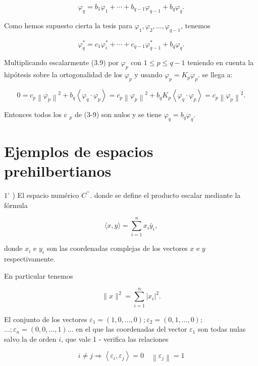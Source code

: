 \documentclass[10pt]{article}
\theoremstyle{plain}
\theoremstyle{definition}
\theoremstyle{remark}
\begin{document}
$$
\varphi_{q}=b_{1} \varphi_{1}+\cdots+b_{q-1} \varphi_{q-1}+b_{q} \varphi_{q} .
$$

Como hemos supuesto cierta la tesis para $\varphi_{1}, \varphi_{2}, \ldots, \varphi_{q-1}$, tenemos


\begin{equation*}
\varphi_{q}^{*}=c_{1} \varphi_{i}^{*}+\cdots+c_{q-1} \varphi_{q-1}^{*}+b_{q} \varphi_{q} . \tag{3-9}
\end{equation*}


Multiplicando escalarmente (3.9) por $\varphi_{p}$ con $1 \leqslant p \leqslant q-1$ teniendo en cuenta la hipótesis sobre la ortogonalidad de los $\varphi_{p}$ y usando $\varphi_{p}=K_{p} \varphi_{p}$. se llega a:

$$
0=c_{p}\left\|\varphi_{\dot{p}}\right\|^{2}+b_{q}\left\langle\varphi_{q} \cdot \varphi_{p}\right\rangle=c_{p}\left\|\varphi_{\dot{p}}\right\|^{2}+b_{q} K_{p}\left\langle\varphi_{q} \cdot \varphi_{p}\right\rangle=c_{p}\left\|\varphi_{p}\right\|^{2} .
$$

Entonces todos los c ${ }_{p}$ de (3-9) son nulos y se tiene $\varphi_{\dot{q}}=b_{q} \varphi_{q}$.

\section*{Ejemplos de espacios prehilbertianos}
$1^{\circ}$ ) El espacio numérico $C^{\prime \prime}$. donde se define el producto escalar mediante la fórmula



\begin{equation*}
\langle x, y\rangle=\sum_{i=1}^{n} x_{i} \bar{y}_{i}, \tag{$3\cdot10$}
\end{equation*}


donde $x_{i}$ e $y_{i}$ son las coordenadas complejas de los vectores $x$ e $y$ respectivamente.

En particular tenemos


\begin{equation*}
\|x\|^{2}=\sum_{i=1}^{n}\left|x_{i}\right|^{2} . \tag{3•11}
\end{equation*}


El conjunto de los vectores $\varepsilon_{1}=(1,0, \ldots, 0) ; \varepsilon_{2}=(0,1, \ldots, 0)$; $\ldots ; \varepsilon_{n}=(0,0, \ldots, 1) \ldots$ en el que las coordenadas del vector $\varepsilon_{1}$ son todas nulas salvo la de orden $i$, que vale 1 - verifica las relaciones

$$
i \neq j \Rightarrow\left\langle\varepsilon_{i}, \varepsilon_{j}\right\rangle=0 \quad\left\|\varepsilon_{j}\right\|=1
$$
\end{document}
